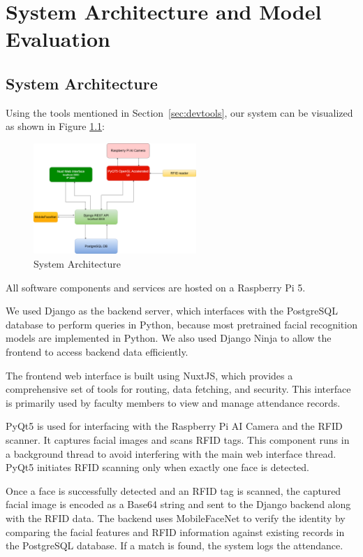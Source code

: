 \chapter{System Architecture and Model Evaluation}
\section{System Architecture}
Using the tools mentioned in Section~\ref{sec:devtools}, our system can be visualized as shown in Figure \ref{fig:architecture}: 
\begin{figure}[h] %
	\centering
	\includegraphics[width=0.55\textwidth]{figures/chapter4/architecture_new.png} %
	\caption{System Architecture}
	\label{fig:architecture}
\end{figure}

All software components and services are hosted on a Raspberry Pi 5.

We used Django as the backend server, which interfaces with the PostgreSQL database to perform queries in Python, because most pretrained facial recognition models are implemented in Python. We also used Django Ninja to allow the frontend to access backend data efficiently.

The frontend web interface is built using NuxtJS, which provides a comprehensive set of tools for routing, data fetching, and security. This interface is primarily used by faculty members to view and manage attendance records.

PyQt5 is used for interfacing with the Raspberry Pi AI Camera and the RFID scanner. It captures facial images and scans RFID tags. This component runs in a background thread to avoid interfering with the main web interface thread. PyQt5 initiates RFID scanning only when exactly one face is detected.

Once a face is successfully detected and an RFID tag is scanned, the captured facial image is encoded as a Base64 string and sent to the Django backend along with the RFID data. The backend uses MobileFaceNet to verify the identity by comparing the facial features and RFID information against existing records in the PostgreSQL database. If a match is found, the system logs the attendance.

